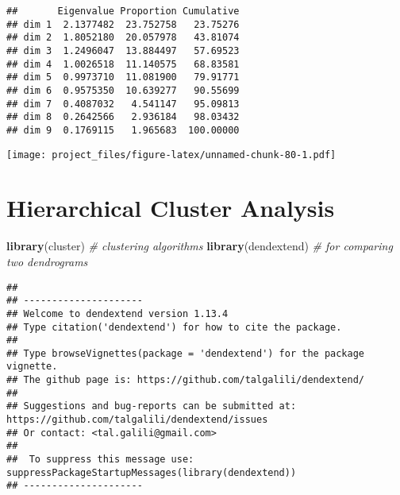 \documentclass[
]{article}
\newenvironment{Shaded}{\begin{snugshade}}{\end{snugshade}}
\newcommand{\CommentTok}[1]{\textcolor[rgb]{0.56,0.35,0.01}{\textit{#1}}}
\newcommand{\DataTypeTok}[1]{\textcolor[rgb]{0.13,0.29,0.53}{#1}}
\newcommand{\DecValTok}[1]{\textcolor[rgb]{0.00,0.00,0.81}{#1}}
\newcommand{\KeywordTok}[1]{\textcolor[rgb]{0.13,0.29,0.53}{\textbf{#1}}}
\newcommand{\NormalTok}[1]{#1}
\newcommand{\OperatorTok}[1]{\textcolor[rgb]{0.81,0.36,0.00}{\textbf{#1}}}
\newcommand{\StringTok}[1]{\textcolor[rgb]{0.31,0.60,0.02}{#1}}
\begin{document}
\begin{verbatim}
##       Eigenvalue Proportion Cumulative
## dim 1  2.1377482  23.752758   23.75276
## dim 2  1.8052180  20.057978   43.81074
## dim 3  1.2496047  13.884497   57.69523
## dim 4  1.0026518  11.140575   68.83581
## dim 5  0.9973710  11.081900   79.91771
## dim 6  0.9575350  10.639277   90.55699
## dim 7  0.4087032   4.541147   95.09813
## dim 8  0.2642566   2.936184   98.03432
## dim 9  0.1769115   1.965683  100.00000
\end{verbatim}

\begin{Shaded}
\end{Shaded}

\texttt{[image: project\_files/figure-latex/unnamed-chunk-80-1.pdf]}

\hypertarget{hierarchical-cluster-analysis}{%
\section{Hierarchical Cluster
Analysis}\label{hierarchical-cluster-analysis}}

\begin{Shaded}
\begin{Highlighting}[]
\KeywordTok{library}\NormalTok{(cluster)    }\CommentTok{# clustering algorithms}
\KeywordTok{library}\NormalTok{(dendextend) }\CommentTok{# for comparing two dendrograms}
\end{Highlighting}
\end{Shaded}

\begin{verbatim}
## 
## ---------------------
## Welcome to dendextend version 1.13.4
## Type citation('dendextend') for how to cite the package.
## 
## Type browseVignettes(package = 'dendextend') for the package vignette.
## The github page is: https://github.com/talgalili/dendextend/
## 
## Suggestions and bug-reports can be submitted at: https://github.com/talgalili/dendextend/issues
## Or contact: <tal.galili@gmail.com>
## 
##  To suppress this message use:  suppressPackageStartupMessages(library(dendextend))
## ---------------------
\end{verbatim}
\end{document}
